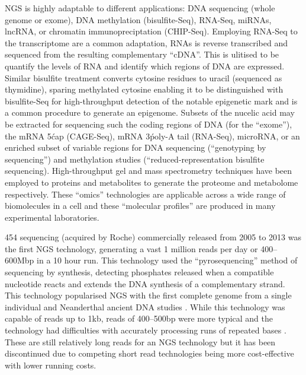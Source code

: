 NGS is highly adaptable to different applications: DNA sequencing (whole genome or exome), DNA methylation (bisulfite-Seq), RNA-Seq, miRNAs, lncRNA, or chromatin immunopreciptation (CHIP-Seq). Employing RNA-Seq to the transcriptome are a common adaptation, RNAs is reverse transcribed and sequenced from the resulting complementary ``cDNA''. This is ulitised to be quantify the levels of RNA and identify which regions of DNA are expressed. Similar bisulfite treatment converts cytosine residues to uracil (sequenced as thymidine), sparing methylated cytosine enabling it to be distinguished with bisulfite-Seq for high-throughput detection of the notable epigenetic mark and is a common procedure to generate an epigenome. Subsets of the nucelic acid may be extracted for sequencing such the coding regions of DNA (for the ``exome''), the mRNA 5\' cap (CAGE-Seq), mRNA 3\' poly-A tail (RNA-Seq), microRNA, or an enriched subset of variable regions for DNA sequencing (``genotyping by sequencing'') and methylation studies (``reduced-representation bisulfite sequencing).  High-throughput gel and mass spectrometry techniques have been employed to proteins and metabolites to generate the proteome and metabolome respectively. These ``omics'' technologies are applicable across a wide range of biomolecules in a cell and these ``molecular profiles'' are produced in many experimental laboratories. %



454 sequencing (acquired by Roche) commercially released from 2005 to 2013 was the first NGS technology, generating a vast 1 million reads per day or 400--600Mbp in a 10 hour run. This technology used the ``pyrosequencing'' method of sequencing by synthesis, detecting phosphates released when a compatible nucleotide reacts and extends the DNA synthesis of a complementary strand. This technology popularised NGS with the first complete genome from a single individual \citep{Wadman2008, Wheeler2008} and Neanderthal ancient DNA studies \citep{Paabo2006, Paabo2009}. While this technology was capable of reads up to 1kb, reads of 400--500bp were more typical and the technology had difficulties with accurately processing runs of repeated bases \citep{Rothberg2008}. These are still relatively long reads for an NGS technology but it has been discontinued due to competing short read technologies being more cost-effective with lower running costs.

